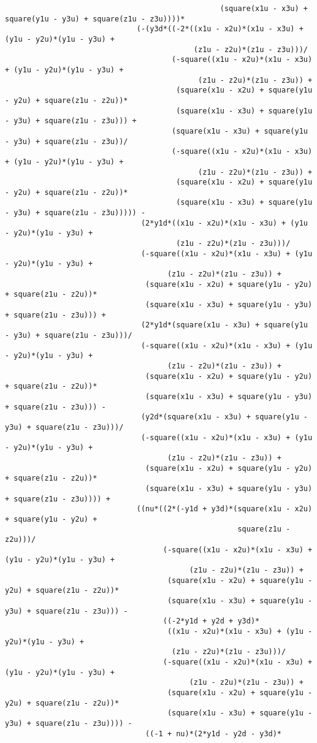 \begin{lstlisting}
												 (square(x1u - x3u) + square(y1u - y3u) + square(z1u - z3u))))*
							  (-(y3d*((-2*((x1u - x2u)*(x1u - x3u) + (y1u - y2u)*(y1u - y3u) + 
										   (z1u - z2u)*(z1u - z3u)))/
									  (-square((x1u - x2u)*(x1u - x3u) + (y1u - y2u)*(y1u - y3u) + 
											(z1u - z2u)*(z1u - z3u)) + 
									   (square(x1u - x2u) + square(y1u - y2u) + square(z1u - z2u))*
									   (square(x1u - x3u) + square(y1u - y3u) + square(z1u - z3u))) + 
									  (square(x1u - x3u) + square(y1u - y3u) + square(z1u - z3u))/
									  (-square((x1u - x2u)*(x1u - x3u) + (y1u - y2u)*(y1u - y3u) + 
											(z1u - z2u)*(z1u - z3u)) + 
									   (square(x1u - x2u) + square(y1u - y2u) + square(z1u - z2u))*
									   (square(x1u - x3u) + square(y1u - y3u) + square(z1u - z3u))))) - 
							   (2*y1d*((x1u - x2u)*(x1u - x3u) + (y1u - y2u)*(y1u - y3u) + 
									   (z1u - z2u)*(z1u - z3u)))/
							   (-square((x1u - x2u)*(x1u - x3u) + (y1u - y2u)*(y1u - y3u) + 
									 (z1u - z2u)*(z1u - z3u)) + 
								(square(x1u - x2u) + square(y1u - y2u) + square(z1u - z2u))*
								(square(x1u - x3u) + square(y1u - y3u) + square(z1u - z3u))) + 
							   (2*y1d*(square(x1u - x3u) + square(y1u - y3u) + square(z1u - z3u)))/
							   (-square((x1u - x2u)*(x1u - x3u) + (y1u - y2u)*(y1u - y3u) + 
									 (z1u - z2u)*(z1u - z3u)) + 
								(square(x1u - x2u) + square(y1u - y2u) + square(z1u - z2u))*
								(square(x1u - x3u) + square(y1u - y3u) + square(z1u - z3u))) - 
							   (y2d*(square(x1u - x3u) + square(y1u - y3u) + square(z1u - z3u)))/
							   (-square((x1u - x2u)*(x1u - x3u) + (y1u - y2u)*(y1u - y3u) + 
									 (z1u - z2u)*(z1u - z3u)) + 
								(square(x1u - x2u) + square(y1u - y2u) + square(z1u - z2u))*
								(square(x1u - x3u) + square(y1u - y3u) + square(z1u - z3u)))) + 
							  ((nu*((2*(-y1d + y3d)*(square(x1u - x2u) + square(y1u - y2u) + 
													 square(z1u - z2u)))/
									(-square((x1u - x2u)*(x1u - x3u) + (y1u - y2u)*(y1u - y3u) + 
										  (z1u - z2u)*(z1u - z3u)) + 
									 (square(x1u - x2u) + square(y1u - y2u) + square(z1u - z2u))*
									 (square(x1u - x3u) + square(y1u - y3u) + square(z1u - z3u))) - 
									((-2*y1d + y2d + y3d)*
									 ((x1u - x2u)*(x1u - x3u) + (y1u - y2u)*(y1u - y3u) + 
									  (z1u - z2u)*(z1u - z3u)))/
									(-square((x1u - x2u)*(x1u - x3u) + (y1u - y2u)*(y1u - y3u) + 
										  (z1u - z2u)*(z1u - z3u)) + 
									 (square(x1u - x2u) + square(y1u - y2u) + square(z1u - z2u))*
									 (square(x1u - x3u) + square(y1u - y3u) + square(z1u - z3u)))) - 
								((-1 + nu)*(2*y1d - y2d - y3d)*

\end{lstlisting}

